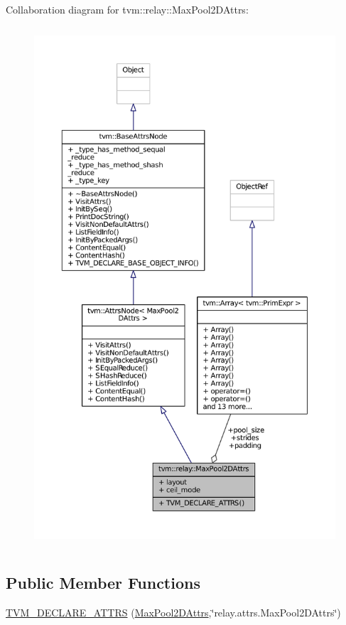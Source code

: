 Collaboration diagram for tvm\+:\+:relay\+:\+:Max\+Pool2\+D\+Attrs\+:
\nopagebreak
\begin{figure}[H]
\begin{center}
\leavevmode
\includegraphics[height=550pt]{structtvm_1_1relay_1_1MaxPool2DAttrs__coll__graph}
\end{center}
\end{figure}
\subsection*{Public Member Functions}
\begin{DoxyCompactItemize}
\item 
\hyperlink{structtvm_1_1relay_1_1MaxPool2DAttrs_ac9d500ff95175f42510018b55586ec8b}{T\+V\+M\+\_\+\+D\+E\+C\+L\+A\+R\+E\+\_\+\+A\+T\+T\+RS} (\hyperlink{structtvm_1_1relay_1_1MaxPool2DAttrs}{Max\+Pool2\+D\+Attrs},\char`\"{}relay.\+attrs.\+Max\+Pool2\+D\+Attrs\char`\"{})
\end{DoxyCompactItemize}
